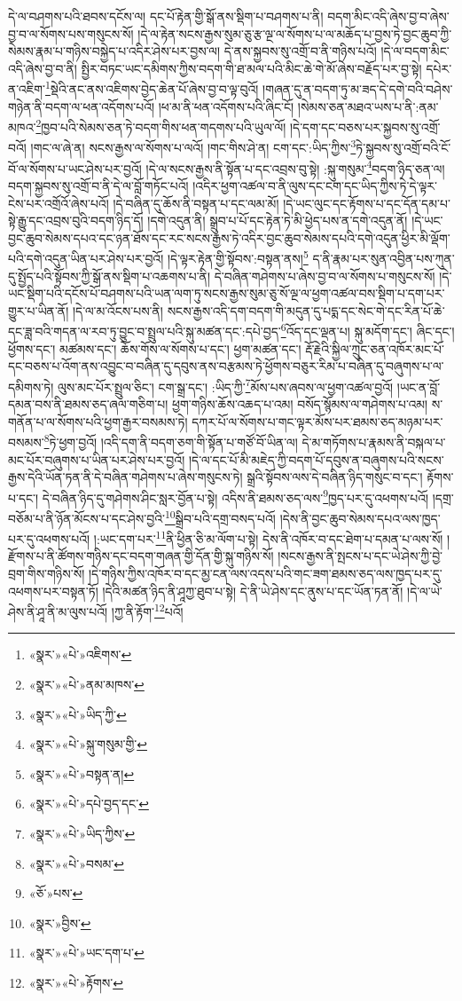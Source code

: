 དེ་ལ་བཤགས་པའི་ཐབས་དངོས་ལ། དང་པོ་རྟེན་གྱི་སྒོ་ནས་སྡིག་པ་བཤགས་པ་ནི། བདག་མིང་འདི་ཞེས་བྱ་བ་ཞེས་བྱ་བ་ལ་སོགས་པས་གསུངས་སོ། །དེ་ལ་རྟེན་སངས་རྒྱས་སུམ་ཅུ་རྩ་ལྔ་ལ་སོགས་པ་ལ་མཆོད་པ་བྱས་ཏེ་བྱང་ཆུབ་ཀྱི་སེམས་རྣམ་པ་གཉིས་བསྐྱེད་པ་འདིར་ཤེས་པར་བྱས་ལ། དེ་ནས་སྐྱབས་སུ་འགྲོ་བ་ནི་གཉིས་པའོ། །དེ་ལ་བདག་མིང་འདི་ཞེས་བྱ་བ་ནི། སྤྱིར་བཏང་ཡང་དམིགས་ཀྱིས་བདག་གི་ཐ་མལ་པའི་མིང་ཆེ་གེ་མོ་ཞེས་བརྗོད་པར་བྱ་སྟེ། དཔེར་ན་འཇིག་\footnote{«སྣར་»«པེ་»འཇིགས་}སྡེའི་ནང་ནས་འཇིགས་བྱེད་ཆེན་པོ་ཞེས་བྱ་བ་ལྟ་བུའོ། །གཞན་དུ་ན་བདག་ཏུ་མ་ཟད་དེ་དགེ་བའི་བཤེས་གཉེན་ནི་བདག་ལ་ཕན་འདོགས་པའོ། །ཕ་མ་ནི་ཕན་འདོགས་པའི་ཞིང་ངོ། །སེམས་ཅན་མཐའ་ཡས་པ་ནི་:ནམ་མཁའ་\footnote{«སྣར་»«པེ་»ནམ་མཁས་}ཁྱབ་པའི་སེམས་ཅན་ཏེ་བདག་གིས་ཕན་གདགས་པའི་ཡུལ་ལོ། །དེ་དག་དང་བཅས་པར་སྐྱབས་སུ་འགྲོ་བའོ། །གང་ལ་ཞེ་ན། སངས་རྒྱས་ལ་སོགས་པ་ལའོ། །གང་གིས་ཤེ་ན། ངག་དང་:ཡིད་ཀྱིས་\footnote{«སྣར་»«པེ་»ཡིད་ཀྱི་}ཏེ་སྐྱབས་སུ་འགྲོ་བའི་ངོ་བོ་ལ་སོགས་པ་ཡང་ཤེས་པར་བྱའོ། །དེ་ལ་སངས་རྒྱས་ནི་སྟོན་པ་དང་འབྲས་བུ་སྟེ། :སྐུ་གསུམ་\footnote{«སྣར་»«པེ་»སྐུ་གསུམ་གྱི་}བདག་ཉིད་ཅན་ལ། བདག་སྐྱབས་སུ་འགྲོ་བ་ནི་དེ་ལ་བློ་གཏོང་པའོ། །འདིར་ཕྱག་འཚལ་བ་ནི་ལུས་དང་ངག་དང་ཡིད་ཀྱིས་ཏེ་དེ་ལྟར་ངེས་པར་འགྲོའོ་ཞེས་པའོ། །དེ་བཞིན་དུ་ཆོས་ནི་བསྟན་པ་དང་ལམ་མོ། །དེ་ཡང་ལུང་དང་རྟོགས་པ་དང་དོན་དམ་པ་སྟེ་རྒྱུ་དང་འབྲས་བུའི་བདག་ཉིད་དོ། །དགེ་འདུན་ནི། སྒྲུབ་པ་པོ་དང་རྟེན་ཏེ་མི་ཕྱེད་པས་ན་དགེ་འདུན་ནོ། །དེ་ཡང་བྱང་ཆུབ་སེམས་དཔའ་དང་ཉན་ཐོས་དང་རང་སངས་རྒྱས་ཏེ་འདིར་བྱང་ཆུབ་སེམས་དཔའི་དགེ་འདུན་ཕྱིར་མི་ལྡོག་པའི་དགེ་འདུན་ཡིན་པར་ཤེས་པར་བྱའོ། །དེ་ལྟར་རྟེན་གྱི་སྟོབས་:བསྟན་ནས།\footnote{«སྣར་»«པེ་»བསྟན་ན།} ད་ནི་རྣམ་པར་སུན་འབྱིན་པས་ཀུན་དུ་སྤྱོད་པའི་སྟོབས་ཀྱི་སྒོ་ནས་སྡིག་པ་འཆགས་པ་ནི། དེ་བཞིན་གཤེགས་པ་ཞེས་བྱ་བ་ལ་སོགས་པ་གསུངས་སོ། །དེ་ཡང་སྡིག་པའི་དངོས་པོ་བཤགས་པའི་ཡན་ལག་ཏུ་སངས་རྒྱས་སུམ་ཅུ་སོ་ལྔ་ལ་ཕྱག་འཚལ་བས་སྡིག་པ་དག་པར་གྱུར་པ་ཡིན་ནོ། །དེ་ལ་མ་འོངས་པས་ནི། སངས་རྒྱས་འདི་དག་བདག་གི་མདུན་དུ་པདྨ་དང་སེང་གེ་དང་རིན་པོ་ཆེ་དང་ཟླ་བའི་གདན་ལ་རབ་ཏུ་བྱུང་བ་སྤྲུལ་པའི་སྐུ་མཚན་དང་:དཔེ་བྱད་\footnote{«སྣར་»«པེ་»དཔེ་བྱད་དང་}འོད་དང་ལྡན་པ། སྐུ་མདོག་དང་། ཞིང་དང་། ཕྱོགས་དང་། མཚམས་དང་། ཆོས་གོས་ལ་སོགས་པ་དང་། ཕྱག་མཚན་དང་། རྡོ་རྗེའི་སྐྱིལ་ཀྲུང་ཅན་འཁོར་མང་པོ་དང་བཅས་པ་འོག་ནས་འབྱུང་བ་བཞིན་དུ་དབུས་ནས་བརྩམས་ཏེ་ཕྱོགས་བཅུར་རིམ་པ་བཞིན་དུ་བཞུགས་པ་ལ་དམིགས་ཏེ། ལུས་མང་པོར་སྤྲུལ་ཅིང་། ངག་སྒྲ་དང་། :ཡིད་ཀྱི་\footnote{«སྣར་»«པེ་»ཡིད་ཀྱིས་}མོས་པས་ཞབས་ལ་ཕྱག་འཚལ་བྱའོ། །ཡང་ན་བློ་དམན་བས་ནི་ཐམས་ཅད་ཞལ་གཅིག་པ། ཕྱག་གཉིས་ཆོས་འཆད་པ་འམ། བསོད་སྙོམས་ལ་གཤེགས་པ་འམ། ས་གནོན་པ་ལ་སོགས་པའི་ཕྱག་རྒྱར་བསམས་ཏེ། དཀར་པོ་ལ་སོགས་པ་གང་ལྟར་མོས་པར་ཐམས་ཅད་མཉམ་པར་བསམས་\footnote{«སྣར་»«པེ་»བསམ་}ཏེ་ཕྱག་བྱའོ། །འདི་དག་ནི་བདག་ཅག་གི་སྟོན་པ་གཙོ་བོ་ཡིན་ལ། དེ་མ་གཏོགས་པ་རྣམས་ནི་བསྐལ་པ་མང་པོར་བཞུགས་པ་ཡིན་པར་ཤེས་པར་བྱའོ། །དེ་ལ་དང་པོ་མི་མཇེད་ཀྱི་བདག་པོ་དབུས་ན་བཞུགས་པའི་སངས་རྒྱས་དེའི་ཡོན་ཏན་ནི་དེ་བཞིན་གཤེགས་པ་ཞེས་གསུངས་ཏེ། སྒྲའི་སྟོབས་ལས་དེ་བཞིན་ཉིད་གསུང་བ་དང་། རྟོགས་པ་དང་། དེ་བཞིན་ཉིད་དུ་གཤེགས་ཤིང་སླར་བྱོན་པ་སྟེ། འདིས་ནི་ཐམས་ཅད་ལས་\footnote{«ཅོ་»པས་}ཁྱད་པར་དུ་འཕགས་པའོ། །དགྲ་བཅོམ་པ་ནི་ཉོན་མོངས་པ་དང་ཤེས་བྱའི་\footnote{«སྣར་»བྱིས་}སྒྲིབ་པའི་དགྲ་བསད་པའོ། །དེས་ནི་བྱང་ཆུབ་སེམས་དཔའ་ལས་ཁྱད་པར་དུ་འཕགས་པའོ། །:ཡང་དག་པར་\footnote{«སྣར་»«པེ་»ཡང་དག་པ་}ནི་ཕྱིན་ཅི་མ་ལོག་པ་སྟེ། དེས་ནི་འཁོར་བ་དང་ཐེག་པ་དམན་པ་ལས་སོ། །རྫོགས་པ་ནི་ཚོགས་གཉིས་དང་བདག་གཞན་གྱི་དོན་གྱི་སྐུ་གཉིས་སོ། །སངས་རྒྱས་ནི་སྤངས་པ་དང་ཡེ་ཤེས་ཀྱི་བྱེ་བྲག་གིས་གཉིས་སོ། །དེ་གཉིས་ཀྱིས་འཁོར་བ་དང་མྱ་ངན་ལས་འདས་པའི་གང་ཟག་ཐམས་ཅད་ལས་ཁྱད་པར་དུ་འཕགས་པར་བསྟན་ཏོ། །དེའི་མཚན་ཉིད་ནི་ཤཱཀྱ་ཐུབ་པ་སྟེ། དེ་ནི་ཡེ་ཤེས་དང་ནུས་པ་དང་ཡོན་ཏན་ནོ། །དེ་ལ་ཡེ་ཤེས་ནི་ཤཱ་ནི་མ་ལུས་པའོ། །ཀྱ་ནི་རྟོག་\footnote{«སྣར་»«པེ་»རྟོགས་}པའོ། 